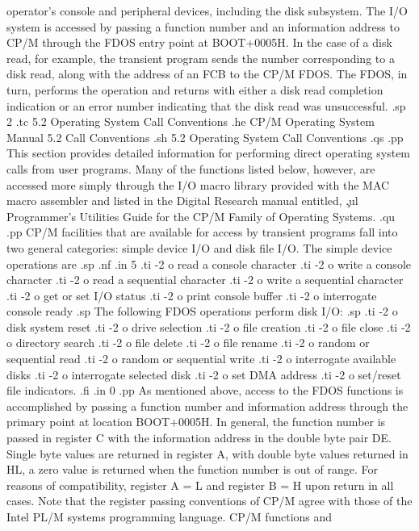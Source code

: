 operator's console and peripheral devices, including the disk subsystem.  The
I/O system is accessed by passing a function number and an information address
to CP/M through the FDOS entry point at BOOT+0005H.  In the case of a disk
read, for example, the transient program sends the number corresponding to a
disk read, along with the address of an FCB to the CP/M FDOS.  The FDOS, in
turn, performs the operation and returns with either a disk read completion
indication or an error number indicating that the disk read was unsuccessful.
.sp 2
.tc    5.2  Operating System Call Conventions
.he CP/M Operating System Manual                5.2  Call Conventions
.sh
5.2  Operating System Call Conventions
.qs
.pp
This section provides detailed information for performing direct operating
system calls from user programs.  Many of the functions listed below, however,
are accessed more simply through the I/O macro library provided with the
MAC macro assembler and listed in the Digital Research manual 
entitled, \c
.ul
Programmer's Utilities Guide for the CP/M Family of Operating Systems.
.qu
.pp
CP/M facilities that are available for access by transient programs fall into
two general categories:  simple device I/O and disk file I/O.  The simple
device operations are
.sp
.nf
.in 5
.ti -2
o read a console character
.ti -2
o write a console character
.ti -2
o read a sequential character
.ti -2
o write a sequential character
.ti -2
o get or set I/O status
.ti -2
o print console buffer
.ti -2
o interrogate console ready
.sp
The following FDOS operations perform disk I/O:
.sp
.ti -2
o disk system reset
.ti -2
o drive selection
.ti -2
o file creation
.ti -2
o file close
.ti -2
o directory search
.ti -2
o file delete
.ti -2
o file rename
.ti -2
o random or sequential read
.ti -2
o random or sequential write
.ti -2
o interrogate available disks
.ti -2
o interrogate selected disk
.ti -2
o set DMA address
.ti -2
o set/reset file indicators.
.fi
.in 0
.pp
As mentioned above, access to the FDOS functions is accomplished by passing
a function number and information address through the primary point at
location BOOT+0005H.  In general, the function number is passed in register C
with the information address in the double byte pair DE.  Single byte values
are returned in register A, with double byte values returned in HL, a zero
value is returned when the function number is out of range.  For reasons of
compatibility, register A = L and register B = H upon return in all cases.
Note that the register passing conventions of CP/M agree with
those of the Intel PL/M systems programming language.  CP/M functions and
